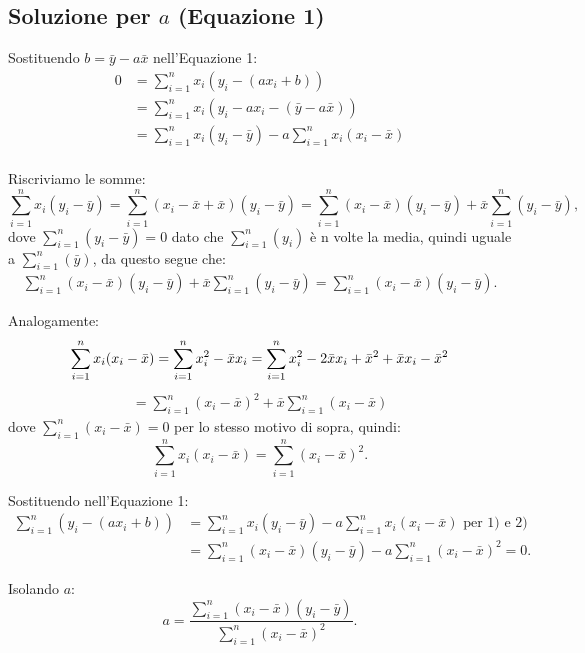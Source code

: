 \documentclass[a4paper]{report}
\begin{document}
\subsection{Soluzione per \( a \) (Equazione 1)}

Sostituendo \( b = \bar{y} - a \bar{x} \) nell'Equazione 1:
\begin{align*}
0 &= \sum_{i=1}^{n} x_i\left( y_i - (a x_i + b) \right) \\
&= \sum_{i=1}^n x_i \left( y_i - a x_i - (\bar{y} - a \bar{x}) \right) \\
&= \sum_{i=1}^n x_i (y_i - \bar{y}) - a \sum_{i=1}^n x_i (x_i - \bar{x}) \\
\end{align*}

Riscriviamo le somme:
\[
    \sum_{i=1}^n x_i (y_i - \bar{y}) = \sum_{i=1}^n (x_i - \bar{x} + \bar{x})(y_i - \bar{y}) = \sum_{i=1}^n (x_i - \bar{x})(y_i - \bar{y}) + \bar{x} \sum_{i=1}^n (y_i - \bar{y}),
\]
dove \(\sum_{i=1}^n (y_i - \bar{y}) = 0\) dato che \(\sum_{i=1}^n (y_i)\) è n volte la media, quindi uguale a \(\sum_{i=1}^n (\bar{y})\), da questo segue che:
\begin{align}
\sum_{i=1}^n (x_i - \bar{x})(y_i - \bar{y}) + \bar{x} \sum_{i=1}^n (y_i - \bar{y}) = \sum_{i=1}^n (x_i - \bar{x})(y_i - \bar{y}).
\end{align}

Analogamente:
\begin{equation*}
\sum_{i=1}^n x_i (x_i - \bar{x}) = \sum_{i=1}^n x_i^2 - \bar{x} x_i = \sum_{i=1}^n x_i^2 - 2\bar{x} x_i + \bar{x}^2 + \bar{x}x_i -\bar{x}^2 \\
\end{equation*}
\begin{align} 
= \sum_{i=1}^n (x_i - \bar{x})^2 + \bar{x} \sum_{i=1}^n (x_i - \bar{x})
\end{align}
dove \(\sum_{i=1}^n (x_i - \bar{x}) = 0\) per lo stesso motivo di sopra, quindi:
\[
\sum_{i=1}^n x_i (x_i - \bar{x}) = \sum_{i=1}^n (x_i - \bar{x})^2.
\]

Sostituendo nell'Equazione 1:
\begin{align*}
\sum_{i=1}^{n} \left( y_i - (a x_i + b) \right) &= \sum_{i=1}^n x_i (y_i - \bar{y}) - a \sum_{i=1}^n x_i (x_i - \bar{x}) \text{ per 1) e 2)}\\
&= \sum_{i=1}^n (x_i - \bar{x})(y_i - \bar{y}) - a \sum_{i=1}^n (x_i - \bar{x})^2 = 0.
\end{align*}

Isolando \( a \):
\[
a = \frac{\sum_{i=1}^n (x_i - \bar{x})(y_i - \bar{y})}{\sum_{i=1}^n (x_i - \bar{x})^2}.
\]
\end{document}

